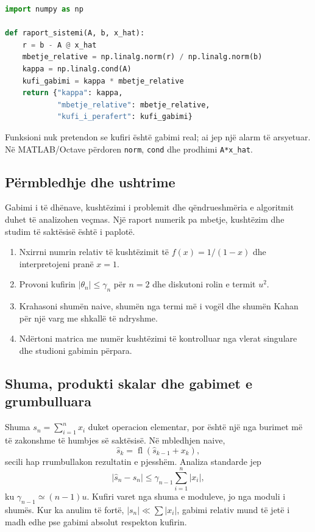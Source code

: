 \documentclass[11pt,oneside,openany]{book}
\begin{document}
\begin{lstlisting}[language=Python,caption={Raport diagnostik për një sistem linear.}]
import numpy as np

def raport_sistemi(A, b, x_hat):
    r = b - A @ x_hat
    mbetje_relative = np.linalg.norm(r) / np.linalg.norm(b)
    kappa = np.linalg.cond(A)
    kufi_gabimi = kappa * mbetje_relative
    return {"kappa": kappa,
            "mbetje_relative": mbetje_relative,
            "kufi_i_perafert": kufi_gabimi}
\end{lstlisting}
Funksioni nuk pretendon se kufiri është gabimi real; ai jep një alarm të arsyetuar. Në MATLAB/Octave përdoren \texttt{norm}, \texttt{cond} dhe prodhimi \texttt{A*x\_hat}.

\subsection{Përmbledhje dhe ushtrime}
Gabimi i të dhënave, kushtëzimi i problemit dhe qëndrueshmëria e algoritmit duhet të analizohen veçmas. Një raport numerik pa mbetje, kushtëzim dhe studim të saktësisë është i paplotë.
\begin{enumerate}
\item Nxirrni numrin relativ të kushtëzimit të $f(x)=1/(1-x)$ dhe interpretojeni pranë $x=1$.
\item Provoni kufirin $|\theta_n|\le\gamma_n$ për $n=2$ dhe diskutoni rolin e termit $u^2$.
\item Krahasoni shumën naive, shumën nga termi më i vogël dhe shumën Kahan për një varg me shkallë të ndryshme.
\item Ndërtoni matrica me numër kushtëzimi të kontrolluar nga vlerat singulare dhe studioni gabimin përpara.
\end{enumerate}



\subsection{Shuma, produkti skalar dhe gabimet e grumbulluara}
Shuma $s_n=\sum_{i=1}^{n}x_i$ duket operacion elementar, por është një nga burimet më të zakonshme të humbjes së saktësisë. Në mbledhjen naive,
\begin{equation}
 \widehat s_k=\operatorname{fl}(\widehat s_{k-1}+x_k),
\end{equation}
secili hap rrumbullakon rezultatin e pjesshëm. Analiza standarde jep
\begin{equation}
 |\widehat s_n-s_n|\le\gamma_{n-1}\sum_{i=1}^{n}|x_i|,
\end{equation}
ku $\gamma_{n-1}\simeq(n-1)u$. Kufiri varet nga shuma e moduleve, jo nga moduli i shumës. Kur ka anulim të fortë, $|s_n|\ll\sum|x_i|$, gabimi relativ mund të jetë i madh edhe pse gabimi absolut respekton kufirin.
\end{document}

